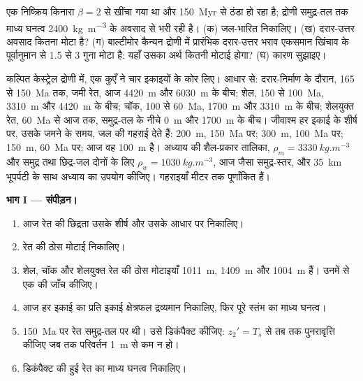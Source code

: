 \begin{exercise}[$\star\star\star$]\label{exo:b2:basins-compared:12}
एक निष्क्रिय किनारा $\beta = 2$ से खींचा गया था और \qty{150}{Myr} से ठंडा हो रहा है;
द्रोणी समुद्र-तल तक माध्य घनत्व \qty{2400}{kg.m^{-3}} के अवसाद से भरी रही है।
(क) जल-भारित  निकालिए। (ख) दरार-उत्तर अवसाद कितना मोटा है?
(ग) बाल्टीमोर कैन्यन द्रोणी में प्रारंभिक दरार-उत्तर भराव एकसमान खिंचाव के पूर्वानुमान से 1.5 से 3 गुना
मोटा है: यहाँ उसका अर्थ कितनी मोटाई होगा? (घ) कारण सुझाइए।
\end{exercise}

\begin{problem}[{सप्ताहांत समस्या --- किसी कुएँ का बैकस्ट्रिपिंग}]\label{pb:b2:basins-compared:1}
कल्पित केस्ट्रेल द्रोणी में, एक कुएँ ने चार इकाइयों के कोर लिए। आधार से: दरार-निर्माण के दौरान,
165 से \qty{150}{Ma} तक, जमी रेत, आज \qty{4420}{m} और \qty{6030}{m} के बीच; शेल, 150
से \qty{100}{Ma}, \qty{3310}{m} और \qty{4420}{m} के बीच; चॉक, 100 से \qty{60}{Ma},
\qty{1700}{m} और \qty{3310}{m} के बीच; शेलयुक्त रेत, \qty{60}{Ma} से आज तक, समुद्र-तल के नीचे \qty{0}{m} और
\qty{1700}{m} के बीच। जीवाश्म हर इकाई के शीर्ष पर, उसके जमने के समय, जल की गहराई देते हैं:
\qty{200}{m}, \qty{150}{Ma} पर; \qty{300}{m}, \qty{100}{Ma} पर;
\qty{150}{m}, \qty{60}{Ma} पर; आज वह \qty{100}{m} है। अध्याय की शैल-प्रकार तालिका, $\rho_m =
\qty{3330}{kg.m^{-3}}$ और समुद्र तथा छिद्र-जल दोनों के लिए $\rho_w = \qty{1030}{kg.m^{-3}}$, आज जैसा
समुद्र-स्तर, और \qty{35}{km} भूपर्पटी के साथ अध्याय का  उपयोग कीजिए। गहराइयाँ
मीटर तक पूर्णांकित हैं।

\noindent\textbf{भाग I --- संपीड़न।}
\begin{enumerate}
  \item आज रेत की छिद्रता उसके शीर्ष और उसके आधार पर निकालिए।
  \item रेत की ठोस मोटाई निकालिए।
  \item शेल, चॉक और शेलयुक्त रेत की ठोस मोटाइयाँ \qty{1011}{m},
        \qty{1409}{m} और \qty{1004}{m} हैं। उनमें से एक की जाँच कीजिए।
  \item आज हर इकाई का प्रति इकाई क्षेत्रफल द्रव्यमान निकालिए, फिर पूरे स्तंभ का
        माध्य घनत्व।
  \item \qty{150}{Ma} पर रेत समुद्र-तल पर थी। उसे डिकंपैक्ट कीजिए: $z_2' =
        T_s$ से तब तक पुनरावृत्ति कीजिए जब तक परिवर्तन \qty{1}{m} से कम न हो।
  \item डिकंपैक्ट की हुई रेत का माध्य घनत्व निकालिए।
\end{enumerate}


\end{problem}
